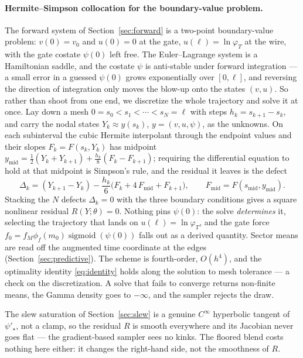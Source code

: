 \documentclass[11pt]{article}
\DeclareMathOperator{\sigmoid}{sigmoid}
\begin{document}
\paragraph{Hermite--Simpson collocation for the boundary-value problem.} The forward system of Section~\ref{sec:forward} is a two-point boundary-value problem: $v(0) = v_0$ and $u(0) = 0$ at the gate, $u(\ell) = \ln \varphi_T$ at the wire, with the gate costate $\psi(0)$ left free. The Euler--Lagrange system is a Hamiltonian saddle, and the costate $\psi$ is anti-stable under forward integration --- a small error in a guessed $\psi(0)$ grows exponentially over $[0, \ell]$, and reversing the direction of integration only moves the blow-up onto the states $(v, u)$. So rather than shoot from one end, we discretize the whole trajectory and solve it at once. Lay down a mesh $0 = s_0 < s_1 < \cdots < s_N = \ell$ with steps $h_k = s_{k+1} - s_k$, and carry the nodal states $Y_k \approx y(s_k)$, $y = (v, u, \psi)$, as the unknowns. On each subinterval the cubic Hermite interpolant through the endpoint values and their slopes $F_k = F(s_k, Y_k)$ has midpoint $y_{\mathrm{mid}} = \tfrac{1}{2}(Y_k + Y_{k+1}) + \tfrac{h_k}{8}(F_k - F_{k+1})$; requiring the differential equation to hold at that midpoint is Simpson's rule, and the residual it leaves is the defect
\begin{equation}\label{eq:defect}
\Delta_k = (Y_{k+1} - Y_k) - \frac{h_k}{6}\bigl(F_k + 4\, F_{\mathrm{mid}} + F_{k+1}\bigr), \qquad F_{\mathrm{mid}} = F(s_{\mathrm{mid}}, y_{\mathrm{mid}}).
\end{equation}
Stacking the $N$ defects $\Delta_k = 0$ with the three boundary conditions gives a square nonlinear residual $R(Y; \theta) = 0$. Nothing pins $\psi(0)$: the solve \emph{determines} it, selecting the trajectory that lands on $u(\ell) = \ln \varphi_T$, and the gate force $f_0 = f_M \phi_f(m_0)\sigmoid(\psi(0))$ falls out as a derived quantity. Sector means are read off the augmented time coordinate at the edges (Section~\ref{sec:predictive}). The scheme is fourth-order, $O(h^4)$, and the optimality identity \eqref{eq:identity} holds along the solution to mesh tolerance --- a check on the discretization. A solve that fails to converge returns non-finite means, the Gamma density goes to $-\infty$, and the sampler rejects the draw.

The slew saturation of Section~\ref{sec:slew} is a genuine $C^\infty$ hyperbolic tangent of $\psi'_\star$, not a clamp, so the residual $R$ is smooth everywhere and its Jacobian never goes flat --- the gradient-based sampler sees no kinks. The floored blend costs nothing here either: it changes the right-hand side, not the smoothness of $R$.
\end{document}
